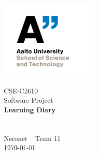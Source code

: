 \begin{titlepage}
\includegraphics[height=4cm]{../gfx/logo_aalto.png}
\vspace*{3cm}
\begin{center}
\large CSE-C2610 \\ Software Project \\[.6cm]
\textbf{\Large Learning Diary} \\[0.4cm]
\huge \lastname{} \\[1cm]
\large \theauthor{} ~ \studentid{} \\
\large Neronet ~ Team 11 \\[0.3cm]
\large \today{} \\
\end{center}
\end{titlepage}
\tableofcontents
\newpage
